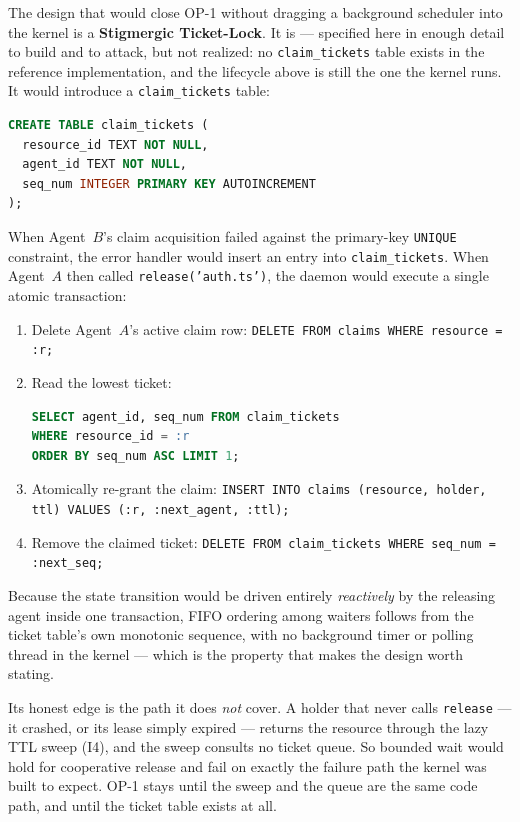 \documentclass[11pt,a4paper]{article}
\theoremstyle{definition}
\theoremstyle{remark}
\begin{document}
The design that would close OP-1 without dragging a background scheduler into the
kernel is a \textbf{Stigmergic Ticket-Lock}. It is \Designed{} --- specified here in
enough detail to build and to attack, but not realized: no \texttt{claim\_tickets}
table exists in the reference implementation, and the lifecycle above is still the
one the kernel runs. It would introduce a \texttt{claim\_tickets} table:
%
\begin{lstlisting}[language=SQL]
CREATE TABLE claim_tickets (
  resource_id TEXT NOT NULL,
  agent_id TEXT NOT NULL,
  seq_num INTEGER PRIMARY KEY AUTOINCREMENT
);
\end{lstlisting}
When Agent~$B$'s claim acquisition failed against the primary-key \texttt{UNIQUE} constraint, the error handler would insert an entry into \texttt{claim\_tickets}. When Agent~$A$ then called \texttt{release('auth.ts')}, the daemon would execute a single atomic transaction:
\begin{enumerate}[leftmargin=1.4em,itemsep=1pt]
\item Delete Agent~$A$'s active claim row: \texttt{DELETE FROM claims WHERE resource = :r;}
\item Read the lowest ticket:
\begin{lstlisting}[language=SQL,basicstyle=\small\ttfamily]
SELECT agent_id, seq_num FROM claim_tickets
WHERE resource_id = :r
ORDER BY seq_num ASC LIMIT 1;
\end{lstlisting}
\item Atomically re-grant the claim: \texttt{INSERT INTO claims (resource, holder, ttl) VALUES (:r, :next\_agent, :ttl);}
\item Remove the claimed ticket: \texttt{DELETE FROM claim\_tickets WHERE seq\_num = :next\_seq;}
\end{enumerate}
Because the state transition would be driven entirely \emph{reactively} by the
releasing agent inside one transaction, FIFO ordering among waiters follows from the
ticket table's own monotonic sequence, with no background timer or polling thread in
the kernel --- which is the property that makes the design worth stating.

Its honest edge is the path it does \emph{not} cover. A holder that never calls
\texttt{release} --- it crashed, or its lease simply expired --- returns the
resource through the lazy TTL sweep (I4), and the sweep consults no ticket queue.
So bounded wait would hold for cooperative release and fail on exactly the
failure path the kernel was built to expect. OP-1 stays \Open{} until the sweep and
the queue are the same code path, and until the ticket table exists at all.
\end{document}
